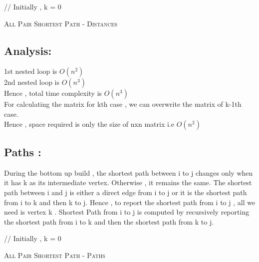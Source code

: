 \documentclass[11pt]{article}
\begin{document}
\begin{algorithm}
// Initially , k = 0 \; 
\caption{\textsc{All Pair Shortest Path - Distances}}
\end{algorithm}

\subsection*{Analysis: }

1st nested loop is $O(n^2)$ \\
2nd nested loop is $O(n^3)$ \\
Hence , total time complexity is $O(n^3)$ \\

For calculating the matrix for kth case , we can overwrite the matrix of k-1th case. \\
Hence , space required is only the size of nxn matrix i.e $O(n^2)$


\subsection*{Paths :}

During the bottom up build , the shortest path between i to j changes only when it has k as its intermediate vertex.
Otherwise , it remains the same.
The shortest path between i and j is either a direct edge from i to j or it is the shortest path from i to k and then k to j.
Hence , to report the shortest path from i to j , all we need is vertex k .
Shortest Path from i to j is computed by recursively reporting the shortest path from i to k and then the shortest path from k to j. \\

\begin{algorithm}
// Initially , k = 0 \; 


\caption{\textsc{All Pair Shortest Path - Paths}}
\end{algorithm}
\end{document}
